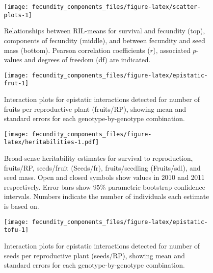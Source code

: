 \documentclass[]{article}
\begin{document}
\newpage

\begin{figure}

{\centering \texttt{[image: fecundity\_components\_files/figure-latex/scatter-plots-1]} 

}

\caption[Scatter plots between RIL-means for survival and fecundity, components of fecundity, and between overall fecundity and seed mass]{Relationships between RIL-means for survival and fecundity (top), components of fecundity (middle), and between fecundity and seed mass (bottom). Pearson correlation coefficients ($r$), associated $p$-values and degrees of freedom (df) are indicated.}\label{fig:scatter-plots}
\end{figure}

\newpage

\begin{figure}

{\centering \texttt{[image: fecundity\_components\_files/figure-latex/epistatic-frut-1]} 

}

\caption[Epistatic interactions for number of fruits per reproductive plant]{Interaction plots for epistatic interactions detected for number of fruits per reproductive plant (fruits/RP), showing mean and standard errors for each genotype-by-genotype combination.}\label{fig:epistatic-frut}
\end{figure}

\newpage

\begin{figure}
\centering
\texttt{[image: fecundity\_components\_files/figure-latex/heritabilities-1.pdf]}
\caption{\label{fig:heritabilities}Broad-sense heritability estimates for survival to reproduction, fruits/RP, seeds/fruit (Seeds/fr), fruits/seedling (Fruits/sdl), and seed mass. Open and closed symbols show values in 2010 and 2011 respectively. Error bars show 95\% parametric bootstrap confidence intervals. Numbers indicate the number of individuals each estimate is based on.}
\end{figure}

\newpage

\begin{figure}

{\centering \texttt{[image: fecundity\_components\_files/figure-latex/epistatic-tofu-1]} 

}

\caption[Epistatic interactions for seeds/RP]{Interaction plots for epistatic interactions detected for number of seeds per reproductive plant (seeds/RP), showing mean and standard errors for each genotype-by-genotype combination.}\label{fig:epistatic-tofu}
\end{figure}
\end{document}
